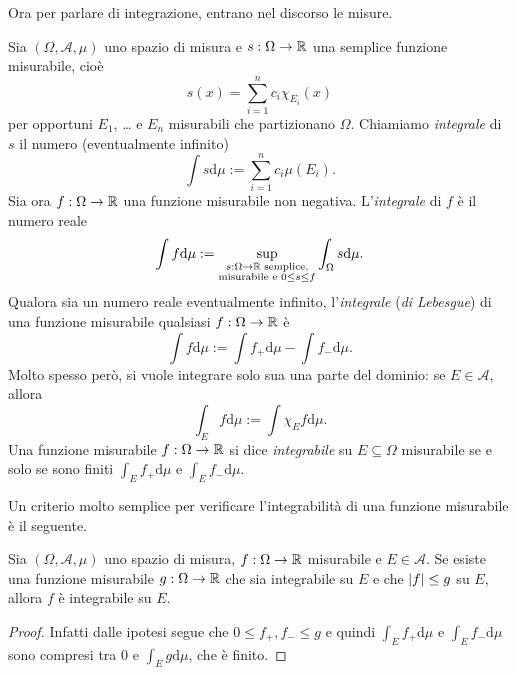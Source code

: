 Ora per parlare di integrazione, entrano nel discorso le misure.

\begin{definizione}
Sia \((\Omega, \mathcal A, \mu)\) uno spazio di misura e \(s : \Omega \to \mathbb R\) una semplice funzione misurabile, cioè
\[s(x) = \sum_{i=1}^n c_i \chi_{E_i}(x)\]
per opportuni \(E_1\), \dots{} e \(E_n\) misurabili che partizionano \(\Omega\). Chiamiamo {\em integrale} di \(s\) il numero (eventualmente infinito)
\[\int s \mathrm d \mu := \sum_{i=1}^n c_i \mu(E_i) .\]
%
Sia ora \(f : \Omega \to \mathbb R\) una funzione misurabile non negativa. L'{\em integrale} di \(f\) è il numero reale
\[\int f \mathrm d \mu := \sup_{\substack{ s : \Omega \to \mathbb R \text{ semplice,} \\ \text{misurabile e } 0 \le s \le f}} \int_\Omega s \mathrm d \mu .\]
Qualora sia un numero reale eventualmente infinito, l'{\em integrale} ({\em di Lebesgue}) di una funzione misurabile qualsiasi \(f : \Omega \to \mathbb R\) è
\[\int f \mathrm d \mu := \int f_+ \mathrm d \mu - \int f_- \mathrm d \mu .\]
Molto spesso però, si vuole integrare solo sua una parte del dominio: se \(E \in \mathcal A\), allora
\[\int_E f \mathrm d \mu := \int \chi_E f \mathrm d \mu .\]
Una funzione misurabile \(f : \Omega \to \mathbb R\) si dice {\em integrabile} su \(E \subseteq \Omega\) misurabile se e solo se sono finiti \(\int_E f_+ \mathrm d \mu\) e \(\int_E f_- \mathrm d \mu\).
\end{definizione}

Un criterio molto semplice per verificare l'integrabilità di una funzione misurabile è il seguente.

\begin{proposizione}\label{proposizione:SempliceCriterioIntegrabilità}
Sia \((\Omega, \mathcal A, \mu)\) uno spazio di misura, \(f : \Omega \to \mathbb R\) misurabile e \(E \in \mathcal A\). Se esiste una funzione misurabile \(g : \Omega \to \mathbb R\) che sia integrabile su \(E\) e che \(\left\lvert f\right\rvert \le g\) su \(E\), allora \(f\) è integrabile su \(E\).
\end{proposizione}

\begin{proof}
Infatti dalle ipotesi segue che \(0 \le f_+, f_- \le g\) e quindi \(\int_E f_+ \mathrm d \mu\) e \(\int_E f_- \mathrm d \mu\) sono compresi tra \(0\) e \(\int_E g \mathrm d \mu\), che è finito.
\end{proof}

